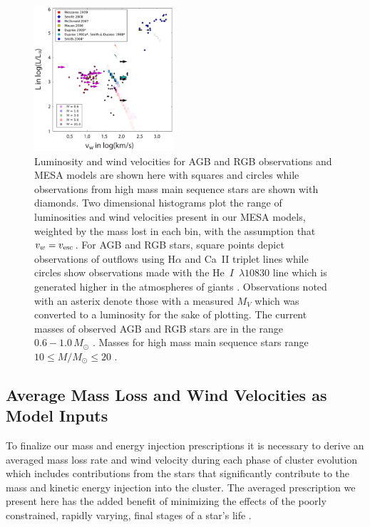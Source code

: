 \documentclass[fleqn,usenatbib]{mnras}
\begin{document}
\begin{figure}
\centering\includegraphics[width=0.46\textwidth]{vwlumFig.pdf}
\caption{Luminosity and wind velocities for AGB and RGB observations and MESA models are shown here with squares and circles while observations from high mass main sequence stars are shown with diamonds.  Two dimensional histograms plot the range of luminosities and wind velocities present in our MESA models, weighted by the mass lost in each bin, with the assumption that $v_w = v_{\rm esc}$.  For AGB and RGB stars, square points depict observations of outflows using H$\alpha$ and Ca~II triplet lines \citep{mauas2006,mcdonald2007,meszaros2009} while circles show observations made with the He~$I$~$\lambda 10830$ line \citep{smith1988,dupree1992a,dupree2009} which is generated higher in the atmospheres of giants \citep{dupree1992b}.  Observations noted with an asterix denote those with a measured $M_V$ which was converted to a luminosity for the sake of plotting.  The current masses of observed AGB and RGB stars are in the range $0.6-1.0 \, M_\odot$ \citep{smith1988,dupree1992a,mauas2006,mcdonald2007,meszaros2009,dupree2009}.   Masses for high mass main sequence stars range $10 \leq M/M_\odot \leq 20$ \citep{searle2008}.}
\label{fig:vwlum2}
\end{figure} 


\subsection{Average Mass Loss and Wind Velocities as Model Inputs} \label{section:averages}

To finalize our mass and energy injection prescriptions it is necessary to derive an averaged mass loss rate and wind velocity during each phase of cluster evolution which includes contributions from the stars that significantly contribute to the mass and kinetic energy injection into the cluster.
The averaged prescription we present here has the added benefit of minimizing the effects of the poorly constrained, rapidly varying, final stages of a star's life \citep{pooley2006}.
\end{document}
